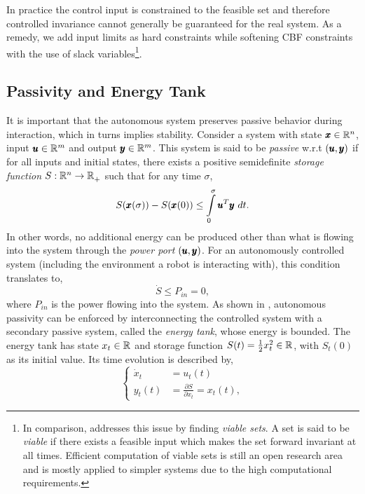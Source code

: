 In practice the control input is constrained to the feasible set and therefore controlled invariance cannot generally be guaranteed for the real system. As a remedy, we add input limits as hard constraints while softening CBF constraints with the use of slack variables\footnote{In comparison, \cite{gurriet2018towards} addresses this issue by finding \emph{viable sets}. A set is said to be \emph{viable} if there exists a feasible input which makes the set forward invariant at all times. Efficient computation of viable sets is still an open research area and is mostly applied to simpler systems due to the high computational requirements.}.

\subsection{Passivity and Energy Tank}
It is important that the autonomous system preserves passive behavior during interaction, which in turns implies stability. Consider a system with state $\pmb{x} \in \mathbb{R}^{n}$, input $\pmb{u} \in \mathbb{R}^{m}$ and output $\pmb{y} \in \mathbb{R}^{m}$. 
This system is said to be \emph{passive} w.r.t $(\pmb{u},\pmb{y})$ if for all inputs and initial states, there exists a positive semidefinite \emph{storage function} $S: \mathbb{R}^{n} \rightarrow \mathbb{R}^{}_+$ such that for any time $\sigma$,
\begin{equation}
    S(\pmb{x}(\sigma)) - S(\pmb{x}(0))\leq \int\limits_{0}^{\sigma} \pmb{u}^T \pmb{y}\ dt.  
\end{equation}
In other words, no additional energy can be produced other than what is flowing into the system through the \textit{power port} $(\pmb{u},\pmb{y})$.
For an autonomously controlled system (including the environment a robot is interacting with), this condition translates to, 
\begin{equation}
    \dot{S} \leq P_{in} = 0,
\end{equation}
where $P_{in}$ is the power flowing into the system. As shown in \cite{shahriari2018valve}, autonomous passivity can be enforced by interconnecting the controlled system with a secondary passive system, called the \emph{energy tank}, whose energy is bounded. The energy tank has state $x_t \in \mathbb{R}^{}$ and storage function $S(t) = \frac{1}{2} x_t^2 \in \mathbb{R}^{}$, with $S_t(0)$ as its initial value. Its time evolution is described by,
\begin{equation}
\begin{cases}
\dot{x}_t &= u_t(t) \\
y_t(t) &= \frac{\partial S}{\partial x_t} = x_t(t),
\end{cases}
\end{equation}
